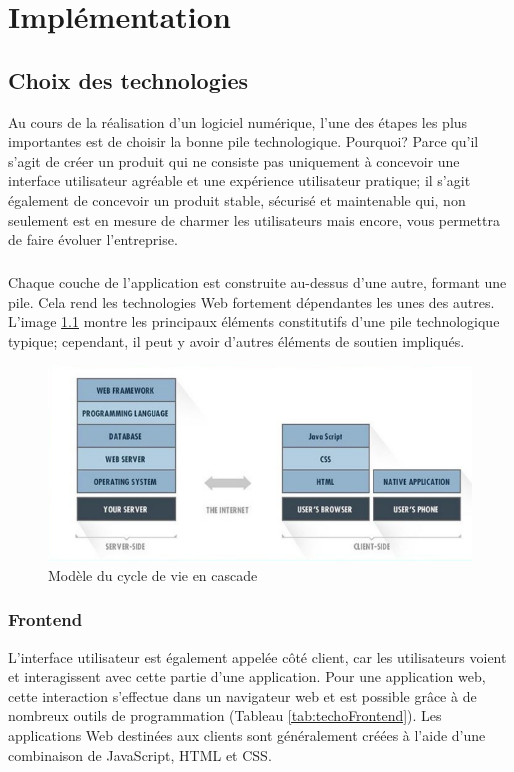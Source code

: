 \chapter{Implémentation}
        \section{Choix des technologies}
        Au cours de la réalisation d'un logiciel numérique,
        l'une des étapes les plus importantes est de choisir la bonne pile technologique. 
        Pourquoi? Parce qu'il s'agit de créer un produit qui ne consiste pas uniquement
        à concevoir une interface utilisateur agréable et une expérience utilisateur 
        pratique; il s'agit également de concevoir un produit stable, sécurisé et 
        maintenable qui, non seulement est en mesure de charmer les utilisateurs mais encore, vous 
        permettra de faire évoluer l'entreprise.
        \paragraph{}
        Chaque couche de l'application est construite au-dessus d'une autre, 
        formant une pile. Cela rend les technologies Web fortement dépendantes 
        les unes des autres. L'image \ref{fig:pile} montre les principaux éléments constitutifs 
        d'une pile technologique typique; cependant, il peut y avoir d'autres éléments de 
        soutien impliqués.
        \begin{figure}[t]
                \centering
                \includegraphics[scale=0.5]{images/Implementation/pile.png}
                \caption{Modèle du cycle de vie en cascade \cite{Bulatovych}}
                \label{fig:pile}
        \end{figure}
        \subsection{Frontend}
        L'interface utilisateur est également appelée côté client, car les utilisateurs voient et interagissent 
        avec cette partie d'une application. Pour une application web, cette interaction s'effectue 
        dans un navigateur web et est possible grâce à de nombreux outils de programmation (Tableau \ref{tab:techoFrontend}). 
        Les applications Web destinées aux clients sont généralement créées à l'aide d'une combinaison 
        de JavaScript, HTML et CSS.
